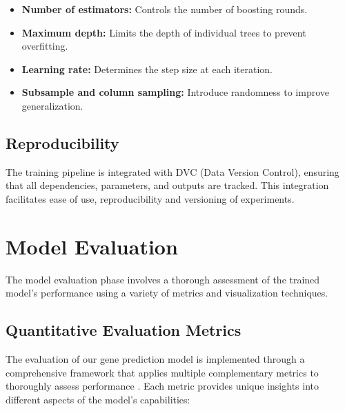 \documentclass[
	a4paper, %
	10pt, %
	unnumberedsections, %
	twoside, %
]{LTJournalArticle}
\begin{document}
\begin{itemize}
    \item \textbf{Number of estimators:} Controls the number of boosting rounds.
    \item \textbf{Maximum depth:} Limits the depth of individual trees to prevent overfitting.
    \item \textbf{Learning rate:} Determines the step size at each iteration.
    \item \textbf{Subsample and column sampling:} Introduce randomness to improve generalization.
\end{itemize}

\subsection{Reproducibility}

The training pipeline is integrated with DVC (Data Version Control), ensuring that all dependencies, parameters, and outputs are tracked. This integration facilitates ease of use, reproducibility \cite{Stodden:2016} and versioning of experiments.

\section{Model Evaluation}

The model evaluation phase involves a thorough assessment of the trained model's performance using a variety of metrics and visualization techniques. 

\subsection{Quantitative Evaluation Metrics}

The evaluation of our gene prediction model is implemented through a comprehensive framework that applies multiple complementary metrics to thoroughly assess performance \cite{Sokolova:2009, Chicco:2020}. Each metric provides unique insights into different aspects of the model's capabilities:
\end{document}
